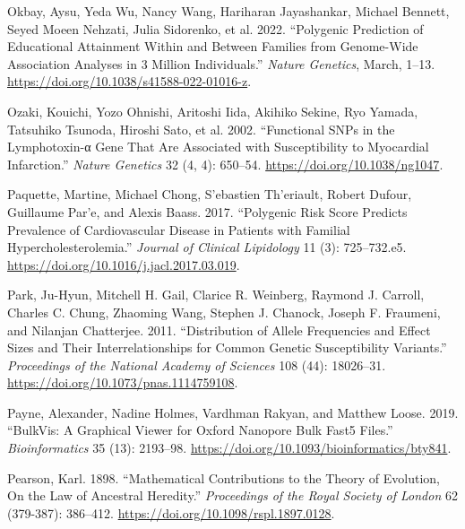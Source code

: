 \documentclass[
]{book}
\newlength{\cslhangindent}
\newlength{\cslentryspacingunit} %
\newenvironment{CSLReferences}[2] %
 {%
  \setlength{\parindent}{0pt}
  \ifodd #1
  \let\oldpar\par
  \def\par{\hangindent=\cslhangindent\oldpar}
  \fi
  \setlength{\parskip}{#2\cslentryspacingunit}
 }%
 {}
\begin{document}
\begin{CSLReferences}{1}{0}
\leavevmode{}%
Okbay, Aysu, Yeda Wu, Nancy Wang, Hariharan Jayashankar, Michael Bennett, Seyed Moeen Nehzati, Julia Sidorenko, et al. 2022. {``Polygenic Prediction of Educational Attainment Within and Between Families from Genome-Wide Association Analyses in 3 Million Individuals.''} \emph{Nature Genetics}, March, 1--13. \url{https://doi.org/10.1038/s41588-022-01016-z}.

\leavevmode{}%
Ozaki, Kouichi, Yozo Ohnishi, Aritoshi Iida, Akihiko Sekine, Ryo Yamada, Tatsuhiko Tsunoda, Hiroshi Sato, et al. 2002. {``Functional {SNPs} in the Lymphotoxin-α Gene That Are Associated with Susceptibility to Myocardial Infarction.''} \emph{Nature Genetics} 32 (4, 4): 650--54. \url{https://doi.org/10.1038/ng1047}.

\leavevmode{}%
Paquette, Martine, Michael Chong, S'ebastien Th'eriault, Robert Dufour, Guillaume Par'e, and Alexis Baass. 2017. {``Polygenic Risk Score Predicts Prevalence of Cardiovascular Disease in Patients with Familial Hypercholesterolemia.''} \emph{Journal of Clinical Lipidology} 11 (3): 725--732.e5. \url{https://doi.org/10.1016/j.jacl.2017.03.019}.

\leavevmode{}%
Park, Ju-Hyun, Mitchell H. Gail, Clarice R. Weinberg, Raymond J. Carroll, Charles C. Chung, Zhaoming Wang, Stephen J. Chanock, Joseph F. Fraumeni, and Nilanjan Chatterjee. 2011. {``Distribution of Allele Frequencies and Effect Sizes and Their Interrelationships for Common Genetic Susceptibility Variants.''} \emph{Proceedings of the National Academy of Sciences} 108 (44): 18026--31. \url{https://doi.org/10.1073/pnas.1114759108}.

\leavevmode{}%
Payne, Alexander, Nadine Holmes, Vardhman Rakyan, and Matthew Loose. 2019. {``{BulkVis}: A Graphical Viewer for {Oxford} Nanopore Bulk {Fast5} Files.''} \emph{Bioinformatics} 35 (13): 2193--98. \url{https://doi.org/10.1093/bioinformatics/bty841}.

\leavevmode{}%
Pearson, Karl. 1898. {``Mathematical Contributions to the Theory of Evolution, {On} the Law of Ancestral Heredity.''} \emph{Proceedings of the Royal Society of London} 62 (379-387): 386--412. \url{https://doi.org/10.1098/rspl.1897.0128}.


\end{CSLReferences}
\end{document}
